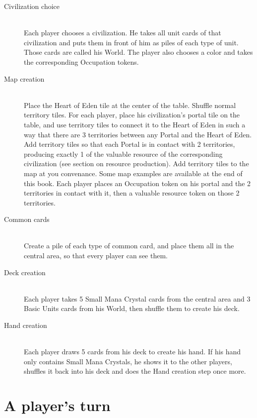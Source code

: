 \documentclass[a4paper]{article}
\begin{document}
    \begin{description}
        \item[Civilization choice] \hfill \\
            Each player chooses a civilization.
            He takes all unit cards of that civilization and puts them in front of him as piles of each type of unit.
            Those cards are called his World.
            The player also chooses a color and takes the corresponding Occupation tokens.
        \item[Map creation] \hfill \\
            Place the Heart of Eden tile at the center of the table.
            Shuffle normal territory tiles.
            For each player, place his civilization's portal tile on the table, and use territory tiles
            to connect it to the Heart of Eden in such a way that there are 3 territories between any Portal and the Heart of Eden.
            Add territory tiles so that each Portal is in contact with 2 territories, producing exactly 1 of the valuable
            resource of the corresponding civilization (see section on resource production).
            Add territory tiles to the map at you convenance. Some map examples are available at the end of this book.
            Each player places an Occupation token on his portal and the 2 territories in contact with it,
            then a valuable resource token on those 2 territories.
        \item[Common cards] \hfill \\
            Create a pile of each type of common card, and place them all in the central area, so that
            every player can see them.
        \item[Deck creation] \hfill \\
            Each player takes 5 Small Mana Crystal cards from the central area and
            3 Basic Units cards from his World, then shuffle them to create his deck.
        \item[Hand creation] \hfill \\
            Each player draws 5 cards from his deck to create his hand.
            If his hand only contains Small Mana Crystals, he shows it to the other players, shuffles it back into his deck
            and does the Hand creation step once more.
    \end{description}



\section{A player's turn}
\end{document}
